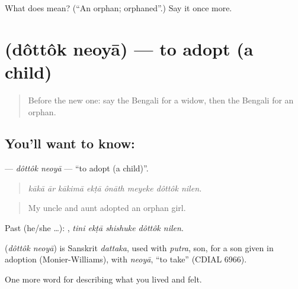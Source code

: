 \begin{tcolorbox}[breakable,colback=teal!4,colframe=teal!35!black,title={Before you move on}]
What does  mean? (\textquotedblleft{}An orphan; orphaned\textquotedblright{}.) Say it once more.
\end{tcolorbox}
\section[\texorpdfstring{\bn{দত্তক} \bn{নেওয়া} (dôttôk neoyā)}{দত্তক নেওয়া (dôttôk neoyā)}]{  (dôttôk neoyā) — to adopt (a child)}

\label{lesson:BN-C490-dottok-neoya}



\begin{quote}
Before the new one: say the Bengali for a widow, then the Bengali for an orphan.
\end{quote}

\subsection*{You'll want to know:  }
\textbf{ } — \emph{dôttôk neoyā} — \textquotedblleft{}to adopt (a child)\textquotedblright{}.

\begin{quote}
       
\end{quote}

\begin{quote}
\emph{kākā ār kākimā ekṭā ônāth meyeke dôttôk nilen.}
\end{quote}

\begin{quote}
My uncle and aunt adopted an orphan girl.
\end{quote}

Past (he/she …):     , \emph{tini ekṭā shishuke dôttôk nilen}.

\begin{cousinweb}
\textbf{ } (\emph{dôttôk neoyā}) is Sanskrit \emph{dattaka}, used with \emph{putra}, son, for a son given in adoption (Monier-Williams), with \emph{neoyā}, \textquotedblleft{}to take\textquotedblright{} (CDIAL 6966).
\end{cousinweb}

\begin{grammarlens}[title={What you've built}]
One more word for describing what you lived and felt.
\end{grammarlens}

